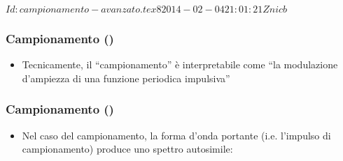 %
%
%
%
%
\svnInfo $Id: campionamento-avanzato.tex 8 2014-02-04 21:01:21Z nicb $

\setcounter{ms}{0}
\begin{frame}
    \frametitle{Campionamento ()}

	\begin{itemize}[<+- | alert@+->]

      \item Tecnicamente, il ``campionamento'' \`e interpretabile
          come ``la modulazione d'ampiezza di una funzione periodica
          impulsiva''

	\end{itemize}

\end{frame}
\setcounter{saved_camp_ms}{\value{ms}}


\setcounter{ms}{\value{saved_camp_ms}}
\begin{frame}
    \frametitle{Campionamento ()}

	\begin{itemize}[<+- | alert@+->]

        \item Nel caso del campionamento, la forma d'onda portante (i.e.
            l'impulso di campionamento) produce uno spettro autosimile:

            \begin{center}
            \end{center}

	\end{itemize}

\end{frame}

